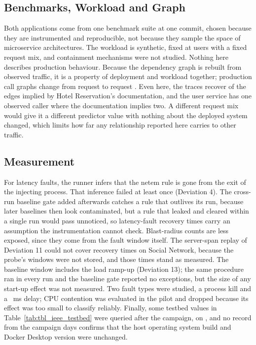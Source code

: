 \subsection{Benchmarks, Workload and Graph}
\label{sec:threat-scope}

Both applications come from one benchmark suite at one commit, chosen because they are
instrumented and reproducible, not because they sample the space of microservice architectures.
The workload is synthetic, fixed at  users with a fixed request mix,
and containment mechanisms were not studied. Nothing here describes production behaviour.
Because the dependency graph is rebuilt from observed traffic, it is a property of deployment and
workload together; production call graphs change from request to request \cite{luo2021}. Even
here, the traces recover  of the
 edges implied by Hotel Reservation's documentation, and the user
service has one observed caller where the documentation implies two.
A different request mix would give it a different predictor value with nothing about the
deployed system changed, which limits how far any relationship reported here carries to other
traffic.

\subsection{Measurement}

For latency faults, the runner infers that the netem rule is gone from the exit of the injecting
process. That inference failed at least once (Deviation 4). The cross-run baseline gate added
afterwards catches a rule that outlives its run, because later baselines then look contaminated,
but a rule that leaked and cleared within a single run would pass unnoticed, so latency-fault
recovery times carry an assumption the instrumentation cannot check. Blast-radius counts are
less exposed, since they come from the fault window itself. The server-span replay of
Deviation 11 could not cover recovery times on Social Network, because the probe's windows were
not stored, and those times stand as measured. The baseline window includes the load ramp-up (Deviation 13); the same
procedure ran in every run and the baseline gate reported no exceptions,
but the size of any start-up effect was not measured. Two fault types were studied, a process
kill and a ~ms delay; CPU contention was evaluated in the pilot and
dropped because its effect was too small to classify reliably. Finally, some testbed values in
Table~\ref{tab:tbl_ieee_testbed} were queried after the campaign, on ,
and no record from the campaign days confirms that the host operating system build and Docker
Desktop version were unchanged.
